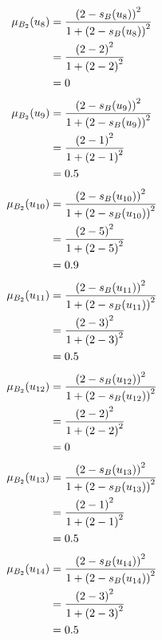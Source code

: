 \documentclass[a4paper,openany]{book}
\begin{document}
				\begin{align}
					\mu_{B_2}(u_8) &= \frac{\left(2-s_B(u_8)\right)^2}{1 + \left(2-s_B(u_8)\right)^2}\\
					&= \frac{\left(2-2\right)^2}{1 + \left(2-2\right)^2} \notag \\
					&= 0 \notag
				\end{align}
				\begin{align}
					\mu_{B_2}(u_9) &= \frac{\left(2-s_B(u_9)\right)^2}{1 + \left(2-s_B(u_9)\right)^2}\\
					&= \frac{\left(2-1\right)^2}{1 + \left(2-1\right)^2} \notag \\
					&= 0.5 \notag
				\end{align}
				\begin{align}
					\mu_{B_2}(u_{10}) &= \frac{\left(2-s_B(u_{10})\right)^2}{1 + \left(2-s_B(u_{10})\right)^2}\\
					&= \frac{\left(2-5\right)^2}{1 + \left(2-5\right)^2} \notag \\
					&= 0.9 \notag
				\end{align}
				\begin{align}
					\mu_{B_2}(u_{11}) &= \frac{\left(2-s_B(u_{11})\right)^2}{1 + \left(2-s_B(u_{11})\right)^2}\\
					&= \frac{\left(2-3\right)^2}{1 + \left(2-3\right)^2} \notag \\
					&= 0.5 \notag
				\end{align}
				\begin{align}
					\mu_{B_2}(u_{12}) &= \frac{\left(2-s_B(u_{12})\right)^2}{1 + \left(2-s_B(u_{12})\right)^2}\\
					&= \frac{\left(2-2\right)^2}{1 + \left(2-2\right)^2} \notag \\
					&= 0 \notag
				\end{align}
				\begin{align}
					\mu_{B_2}(u_{13}) &= \frac{\left(2-s_B(u_{13})\right)^2}{1 + \left(2-s_B(u_{13})\right)^2}\\
					&= \frac{\left(2-1\right)^2}{1 + \left(2-1\right)^2} \notag \\
					&= 0.5 \notag
				\end{align}
				\begin{align}
					\mu_{B_2}(u_{14}) &= \frac{\left(2-s_B(u_{14})\right)^2}{1 + \left(2-s_B(u_{14})\right)^2}\\
					&= \frac{\left(2-3\right)^2}{1 + \left(2-3\right)^2} \notag \\
					&= 0.5 \notag
				\end{align}
\end{document}
